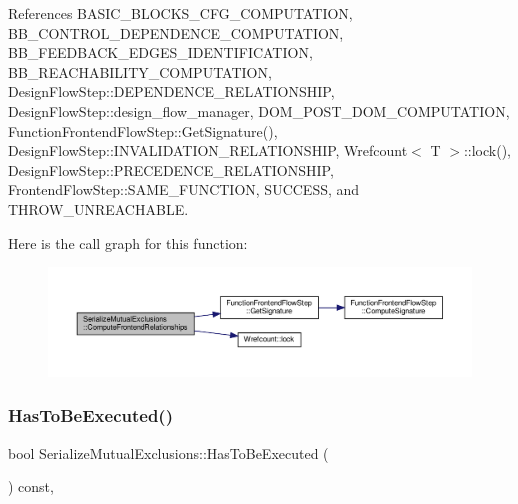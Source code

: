 References B\+A\+S\+I\+C\+\_\+\+B\+L\+O\+C\+K\+S\+\_\+\+C\+F\+G\+\_\+\+C\+O\+M\+P\+U\+T\+A\+T\+I\+ON, B\+B\+\_\+\+C\+O\+N\+T\+R\+O\+L\+\_\+\+D\+E\+P\+E\+N\+D\+E\+N\+C\+E\+\_\+\+C\+O\+M\+P\+U\+T\+A\+T\+I\+ON, B\+B\+\_\+\+F\+E\+E\+D\+B\+A\+C\+K\+\_\+\+E\+D\+G\+E\+S\+\_\+\+I\+D\+E\+N\+T\+I\+F\+I\+C\+A\+T\+I\+ON, B\+B\+\_\+\+R\+E\+A\+C\+H\+A\+B\+I\+L\+I\+T\+Y\+\_\+\+C\+O\+M\+P\+U\+T\+A\+T\+I\+ON, Design\+Flow\+Step\+::\+D\+E\+P\+E\+N\+D\+E\+N\+C\+E\+\_\+\+R\+E\+L\+A\+T\+I\+O\+N\+S\+H\+IP, Design\+Flow\+Step\+::design\+\_\+flow\+\_\+manager, D\+O\+M\+\_\+\+P\+O\+S\+T\+\_\+\+D\+O\+M\+\_\+\+C\+O\+M\+P\+U\+T\+A\+T\+I\+ON, Function\+Frontend\+Flow\+Step\+::\+Get\+Signature(), Design\+Flow\+Step\+::\+I\+N\+V\+A\+L\+I\+D\+A\+T\+I\+O\+N\+\_\+\+R\+E\+L\+A\+T\+I\+O\+N\+S\+H\+IP, Wrefcount$<$ T $>$\+::lock(), Design\+Flow\+Step\+::\+P\+R\+E\+C\+E\+D\+E\+N\+C\+E\+\_\+\+R\+E\+L\+A\+T\+I\+O\+N\+S\+H\+IP, Frontend\+Flow\+Step\+::\+S\+A\+M\+E\+\_\+\+F\+U\+N\+C\+T\+I\+ON, S\+U\+C\+C\+E\+SS, and T\+H\+R\+O\+W\+\_\+\+U\+N\+R\+E\+A\+C\+H\+A\+B\+LE.

Here is the call graph for this function\+:
\nopagebreak
\begin{figure}[H]
\begin{center}
\leavevmode
\includegraphics[width=350pt]{db/da1/classSerializeMutualExclusions_a254a59bffe9ecbe6b77f33934cf8dfbe_cgraph}
\end{center}
\end{figure}
\mbox{\label{classSerializeMutualExclusions_ab1ad51de5bb426b8121949a0f4ceb616}} 
\subsubsection{\texorpdfstring{Has\+To\+Be\+Executed()}{HasToBeExecuted()}}
{\footnotesize\ttfamily bool Serialize\+Mutual\+Exclusions\+::\+Has\+To\+Be\+Executed (\begin{DoxyParamCaption}{ }\end{DoxyParamCaption}) const\hspace{0.3cm}{\ttfamily [override]}, {\ttfamily [virtual]}}



